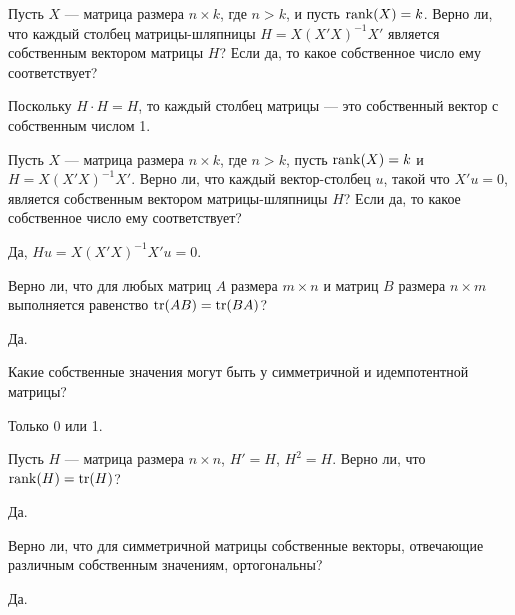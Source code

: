 \begin{problem}
Пусть $X$ — матрица размера ${n \times k}$, где $n > k$, и пусть $\operatorname{rank}(X) = k$. Верно ли, что каждый столбец матрицы-шляпницы $H = X(X'X)^{-1}X'$ является собственным вектором матрицы $H$? Если да, то какое собственное число ему соответствует?


\begin{sol}
Поскольку $H\cdot H = H$, то каждый столбец матрицы — это собственный вектор с собственным числом 1.
\end{sol}
\end{problem}



\begin{problem}
Пусть $X$ — матрица размера ${n \times k}$, где $n > k$, пусть $\operatorname{rank}(X) = k$ и $H = X(X'X)^{-1}X'$. Верно ли, что каждый вектор-столбец $u$, такой что $X'u=0$, является собственным вектором матрицы-шляпницы $H$? Если да, то какое собственное число ему соответствует?


\begin{sol}
Да, $Hu=X(X'X)^{-1}X'u=0$.
\end{sol}
\end{problem}



\begin{problem}
Верно ли, что для любых матриц $A$ размера $m\times n$ и матриц $B$ размера
${n \times m}$ выполняется равенство $\operatorname{tr}(AB) = \operatorname{tr}(BA)$?


\begin{sol}
Да.
\end{sol}
\end{problem}


\begin{problem}
Какие собственные значения могут быть у симметричной и идемпотентной матрицы?
\begin{sol}
Только 0 или 1.
\end{sol}
\end{problem}


\begin{problem}
Пусть $H$ — матрица размера ${n \times n}$, $H'= H$, $H^2 = H$. Верно ли, что $\operatorname{rank}(H) = \operatorname{tr}(H)$?

\begin{sol}
Да.
\end{sol}
\end{problem}



\begin{problem}
Верно ли, что для симметричной матрицы собственные векторы, отвечающие различным собственным значениям, ортогональны?
\begin{sol}
Да.
\end{sol}
\end{problem}



